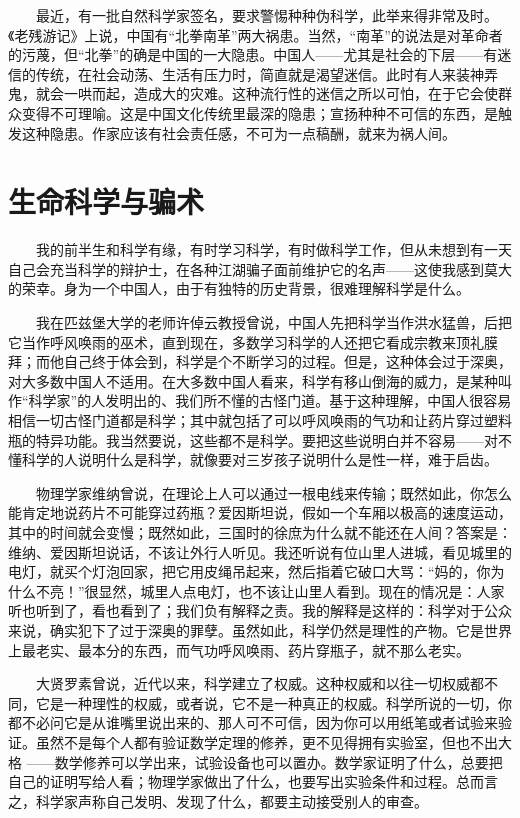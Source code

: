 　　最近，有一批自然科学家签名，要求警惕种种伪科学，此举来得非常及时。《老残游记》上说，中国有“北拳南革”两大祸患。当然，“南革”的说法是对革命者的污蔑，但“北拳”的确是中国的一大隐患。中国人——尤其是社会的下层——有迷信的传统，在社会动荡、生活有压力时，简直就是渴望迷信。此时有人来装神弄鬼，就会一哄而起，造成大的灾难。这种流行性的迷信之所以可怕，在于它会使群众变得不可理喻。这是中国文化传统里最深的隐患；宣扬种种不可信的东西，是触发这种隐患。作家应该有社会责任感，不可为一点稿酬，就来为祸人间。

\chapter{生命科学与骗术}

　　我的前半生和科学有缘，有时学习科学，有时做科学工作，但从未想到有一天自己会充当科学的辩护士，在各种江湖骗子面前维护它的名声——这使我感到莫大的荣幸。身为一个中国人，由于有独特的历史背景，很难理解科学是什么。 

　　我在匹兹堡大学的老师许倬云教授曾说，中国人先把科学当作洪水猛兽，后把它当作呼风唤雨的巫术，直到现在，多数学习科学的人还把它看成宗教来顶礼膜拜；而他自己终于体会到，科学是个不断学习的过程。但是，这种体会过于深奥，对大多数中国人不适用。在大多数中国人看来，科学有移山倒海的威力，是某种叫作“科学家”的人发明出的、我们所不懂的古怪门道。基于这种理解，中国人很容易相信一切古怪门道都是科学；其中就包括了可以呼风唤雨的气功和让药片穿过塑料瓶的特异功能。我当然要说，这些都不是科学。要把这些说明白并不容易——对不懂科学的人说明什么是科学，就像要对三岁孩子说明什么是性一样，难于启齿。 

　　物理学家维纳曾说，在理论上人可以通过一根电线来传输；既然如此，你怎么能肯定地说药片不可能穿过药瓶？爱因斯坦说，假如一个车厢以极高的速度运动，其中的时间就会变慢；既然如此，三国时的徐庶为什么就不能还在人间？答案是：维纳、爱因斯坦说话，不该让外行人听见。我还听说有位山里人进城，看见城里的电灯，就买个灯泡回家，把它用皮绳吊起来，然后指着它破口大骂：“妈的，你为什么不亮！”很显然，城里人点电灯，也不该让山里人看到。现在的情况是：人家听也听到了，看也看到了；我们负有解释之责。我的解释是这样的：科学对于公众来说，确实犯下了过于深奥的罪孽。虽然如此，科学仍然是理性的产物。它是世界上最老实、最本分的东西，而气功呼风唤雨、药片穿瓶子，就不那么老实。 

　　大贤罗素曾说，近代以来，科学建立了权威。这种权威和以往一切权威都不同，它是一种理性的权威，或者说，它不是一种真正的权威。科学所说的一切，你都不必问它是从谁嘴里说出来的、那人可不可信，因为你可以用纸笔或者试验来验证。虽然不是每个人都有验证数学定理的修养，更不见得拥有实验室，但也不出大格 ——数学修养可以学出来，试验设备也可以置办。数学家证明了什么，总要把自己的证明写给人看；物理学家做出了什么，也要写出实验条件和过程。总而言之，科学家声称自己发明、发现了什么，都要主动接受别人的审查。 

